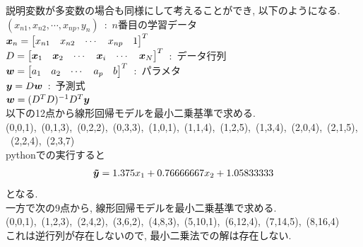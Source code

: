 \documentclass[dvipdfmx,a4j]{jsarticle}
\begin{document}
説明変数が多変数の場合も同様にして考えることができ, 以下のようになる.\\
$(x_{n1},x_{n2},\cdots,x_{np},y_{n})$\ :\ $n$番目の学習データ\\
$\mbox{\boldmath $x$}_{n} = \begin{bmatrix}x_{n1}&x_{n2}&\cdots &x_{np}&1\end{bmatrix}^{T}$\\
$D=\begin{bmatrix}\mbox{\boldmath $x$}_{1}&\mbox{\boldmath $x$}_{2}&\cdots &\mbox{\boldmath $x$}_{i}&\cdots&\mbox{\boldmath $x$}_{N}\end{bmatrix}^{T}$\ :\ データ行列\\
$\mbox{\boldmath $w$}=\begin{bmatrix}a_{1}&a_{2}&\cdots &a_{p}&b \end{bmatrix}^{T}$\ :\ パラメタ\\
    $\mbox{\boldmath $y$} = D\mbox{\boldmath $w$}$\ :\ 予測式\\
    $\mbox{\boldmath $w$}=(D^{T}D)^{-1}D^{T}\mbox{\boldmath $y$}$\\[1cm]
    以下の12点から線形回帰モデルを最小二乗基準で求める.\\
(0,0,1),\ (0,1,3),\ (0,2,2),\ (0,3,3),\ (1,0,1),\ (1,1,4),\ (1,2,5),\ (1,3,4),\ (2,0,4),\ (2,1,5),\ (2,2,4),\ (2,3,7)\\[1cm]
pythonでの実行すると
\begin{eqnarray*}
    \mbox{\boldmath $\tilde{y}$} = 1.375x_{1}+0.76666667x_{2}+1.05833333
\end{eqnarray*}
となる.\\
一方で次の9点から, 線形回帰モデルを最小二乗基準で求める.\\
(0,0,1),\ (1,2,3),\ (2,4,2),\ (3,6,2),\ (4,8,3),\ (5,10,1),\ (6,12,4),\ (7,14,5),\ (8,16,4)\\[1cm]
これは逆行列が存在しないので, 最小二乗法での解は存在しない.\\
\end{document}
